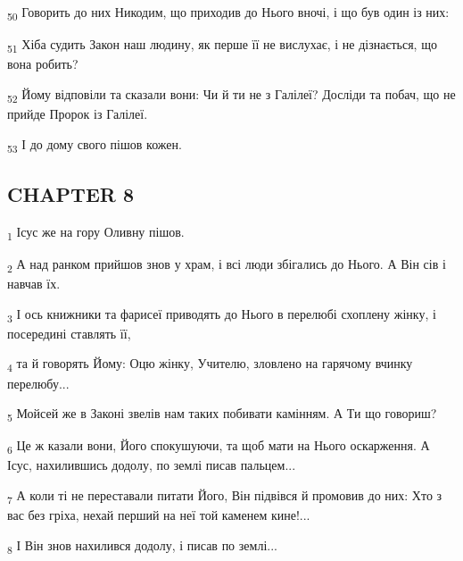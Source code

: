 \begin{tcolorbox}
\textsubscript{50} Говорить до них Никодим, що приходив до Нього вночі, і що був один із них:
\end{tcolorbox}
\begin{tcolorbox}
\textsubscript{51} Хіба судить Закон наш людину, як перше її не вислухає, і не дізнається, що вона робить?
\end{tcolorbox}
\begin{tcolorbox}
\textsubscript{52} Йому відповіли та сказали вони: Чи й ти не з Галілеї? Досліди та побач, що не прийде Пророк із Галілеї.
\end{tcolorbox}
\begin{tcolorbox}
\textsubscript{53} І до дому свого пішов кожен.
\end{tcolorbox}
\subsection{CHAPTER 8}
\begin{tcolorbox}
\textsubscript{1} Ісус же на гору Оливну пішов.
\end{tcolorbox}
\begin{tcolorbox}
\textsubscript{2} А над ранком прийшов знов у храм, і всі люди збігались до Нього. А Він сів і навчав їх.
\end{tcolorbox}
\begin{tcolorbox}
\textsubscript{3} І ось книжники та фарисеї приводять до Нього в перелюбі схоплену жінку, і посередині ставлять її,
\end{tcolorbox}
\begin{tcolorbox}
\textsubscript{4} та й говорять Йому: Оцю жінку, Учителю, зловлено на гарячому вчинку перелюбу...
\end{tcolorbox}
\begin{tcolorbox}
\textsubscript{5} Мойсей же в Законі звелів нам таких побивати камінням. А Ти що говориш?
\end{tcolorbox}
\begin{tcolorbox}
\textsubscript{6} Це ж казали вони, Його спокушуючи, та щоб мати на Нього оскарження. А Ісус, нахилившись додолу, по землі писав пальцем...
\end{tcolorbox}
\begin{tcolorbox}
\textsubscript{7} А коли ті не переставали питати Його, Він підвівся й промовив до них: Хто з вас без гріха, нехай перший на неї той каменем кине!...
\end{tcolorbox}
\begin{tcolorbox}
\textsubscript{8} І Він знов нахилився додолу, і писав по землі...
\end{tcolorbox}
